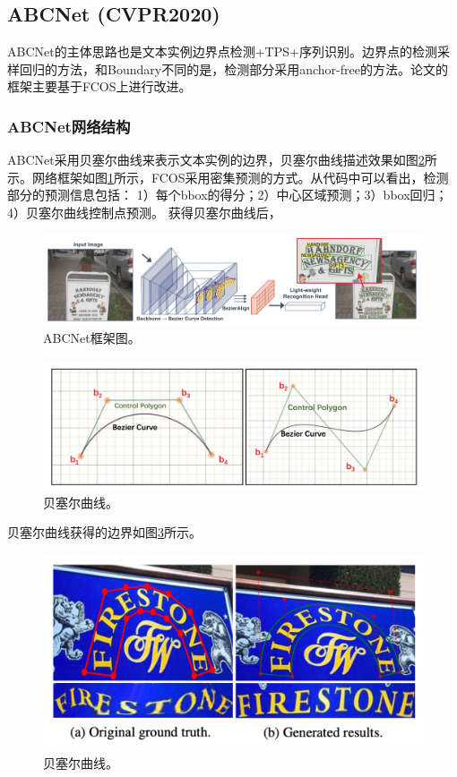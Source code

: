 \subsection{ABCNet (CVPR2020)}
ABCNet的主体思路也是文本实例边界点检测+TPS+序列识别。边界点的检测采样回归的方法，和Boundary不同的是，检测部分采用anchor-free的方法。论文的框架主要基于FCOS\cite{tian2019fcos}上进行改进。
\subsubsection{ABCNet网络结构}
ABCNet采用贝塞尔曲线来表示文本实例的边界，贝塞尔曲线描述效果如图\ref{abcnet_basier}所示。网络框架如图\ref{abcnet_framework}所示，FCOS采用密集预测的方式。从代码中可以看出，检测部分的预测信息包括：
1）每个bbox的得分；2）中心区域预测；3）bbox回归；4）贝塞尔曲线控制点预测。
获得贝塞尔曲线后，
\begin{figure}[htb]
    \centering
    \includegraphics[width=.98\textwidth]{figure/spotting/abcnet_framework.png} 
    \caption{ABCNet框架图。} 
    \label{abcnet_framework} 
\end{figure}

\begin{figure}[htb]
    \centering
    \includegraphics[width=.98\textwidth]{figure/spotting/abcnet_basier.png} 
    \caption{贝塞尔曲线。} 
    \label{abcnet_basier} 
\end{figure}

贝塞尔曲线获得的边界如图\ref{abcnet_sample}所示。
\begin{figure}[htb]
    \centering
    \includegraphics[width=.98\textwidth]{figure/spotting/abcnet_sample.png} 
    \caption{贝塞尔曲线。} 
    \label{abcnet_sample} 
\end{figure}

